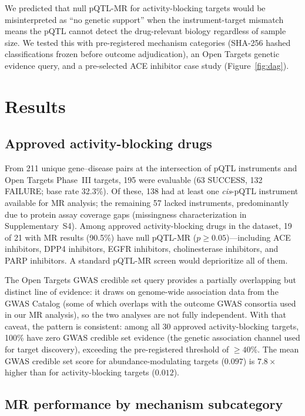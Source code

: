 \documentclass[11pt]{article}
\begin{document}
We predicted that null pQTL-MR for activity-blocking targets would be misinterpreted as ``no genetic support'' when the instrument-target mismatch means the pQTL cannot detect the drug-relevant biology regardless of sample size. We tested this with pre-registered mechanism categories (SHA-256 hashed classifications frozen before outcome adjudication), an Open Targets genetic evidence query, and a pre-selected ACE inhibitor case study (Figure~\ref{fig:dag}).

\section{Results}

\subsection{Approved activity-blocking drugs}
\label{sec:blindspot}

From 211 unique gene--disease pairs at the intersection of pQTL instruments and Open Targets Phase~III targets, 195 were evaluable (63 SUCCESS, 132 FAILURE; base rate 32.3\%). Of these, 138 had at least one \emph{cis}-pQTL instrument available for MR analysis; the remaining 57 lacked instruments, predominantly due to protein assay coverage gaps (missingness characterization in Supplementary~S4). Among approved activity-blocking drugs in the dataset, 19 of 21 with MR results (90.5\%) have null pQTL-MR ($p \geq 0.05$)---including ACE inhibitors, DPP4 inhibitors, EGFR inhibitors, cholinesterase inhibitors, and PARP inhibitors. A standard pQTL-MR screen would deprioritize all of them.

The Open Targets GWAS credible set query provides a partially overlapping but distinct line of evidence: it draws on genome-wide association data from the GWAS Catalog (some of which overlaps with the outcome GWAS consortia used in our MR analysis), so the two analyses are not fully independent. With that caveat, the pattern is consistent: among all 30 approved activity-blocking targets, 100\% have zero GWAS credible set evidence (the genetic association channel used for target discovery), exceeding the pre-registered threshold of $\geq 40\%$. The mean GWAS credible set score for abundance-modulating targets ($0.097$) is $7.8\times$ higher than for activity-blocking targets ($0.012$).

\subsection{MR performance by mechanism subcategory}
\label{sec:gradient}
\end{document}
